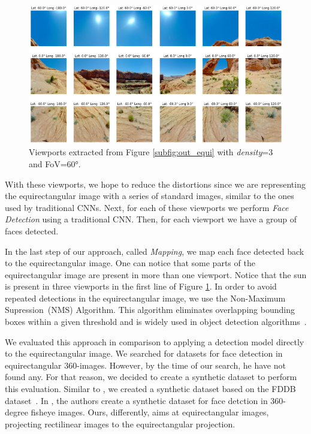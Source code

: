 \begin{figure}[!ht]
    \centering
    \includegraphics[width=1\linewidth]{img/video360/viewports.png}
    \caption{Viewports extracted from Figure \ref{subfig:out_equi} with \emph{density}=3 and FoV=60°.}
    \label{fig:authoring_viewports}
\end{figure}

With these viewports, we hope to reduce the distortions since we are representing the equirectangular image with a series of standard images, similar to the ones used by traditional CNNs. Next, for each of these viewports we perform \emph{Face Detection} using a traditional CNN. Then, for each viewport we have a group of faces detected.

In the last step of our approach, called \emph{Mapping}, we map each face detected back to the equirectangular image. One can notice that some parts of the equirectangular image are present in more than one viewport. Notice that the sun is present in three viewports in the first line of Figure \ref{fig:authoring_viewports}. In order to avoid repeated detections in the equirectangular image, we use the Non-Maximum Supression~(NMS) Algorithm. This algorithm eliminates overlapping bounding boxes within a given threshold and is widely used in object detection algorithms~\cite{nms1, nms2, nms3, nms4, nms5}.

We evaluated this approach in comparison to applying a detection model directly to the equirectangular image. We searched for datasets for face detection in equirectangular 360-images. However, by the time of our search, he have not found any. For that reason, we decided to create a synthetic dataset to perform this evaluation. 
Similar to \cite{fu2019fddb}, we created a synthetic dataset based on the FDDB dataset~\cite{jain2010fddb}. In \cite{fu2019fddb}, the authors create a synthetic dataset for face detction in 360-degree fisheye images. Ours, differently, aims at equirectangular images, projecting rectilinear images to the equirectangular projection.

